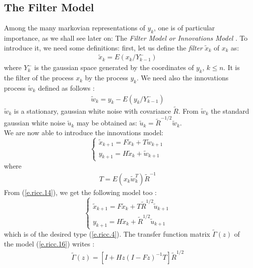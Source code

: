 \subsection{The Filter Model}
\label{filter}
Among the many markovian representations of $y_k$, one is of particular
importance, as we shall see later on: 
The {\em Filter Model {\em or} Innovations Model} . 
To introduce it, we need some definitions: first, let us define 
the {\em filter} $\tilde{x}_k$ of $x_k$ as:
\begin{eqnarray}
\tilde{x}_k=E(x_k/ Y^-_{k-1})
\label{e.ricc.12}
\end{eqnarray}
where $Y^-_{k}$ 
is the gaussian space  generated by the 
coordinates of $y_k$, $k\leq n$. 
It is the filter of the process $x_k$ by the process $y_k$.
We need also the innovations process 
$\tilde{w}_k$ defined as follows :
\begin{eqnarray}
\tilde{w}_k=y_k-E(y_k/Y^-_{k-1})
\label{e.ricc.13}
\end{eqnarray}
$\tilde{w}_k$ is a stationary, gaussian white noise with covariance
$\tilde{R}$. From $\tilde{w}_k$ the standard gaussian white noise 
$\tilde{u}_k$ may be obtained as: $\tilde{u}_k=\tilde{R}^{-1/2}\tilde{w}_k$.\\
We are now able to introduce the innovations model:
\begin{equation}
\left\{ \begin{array}{ll}
\tilde{x}_{k+1}=F\tilde{x}_k + T\tilde{w}_{k+1}\\
y_{k+1}=H\tilde{x}_k + \tilde{w}_{k+1}
\end{array} \right.
\label{e.ricc.14}
\end{equation}
where
\begin{eqnarray}
T=E(x_k\tilde{w}_k^T)\tilde{R}^{-1}
\label{e.ricc.15}
\end{eqnarray}
From (\ref{e.ricc.14}), we get the following model too : 
\begin{equation}
\left\{
\begin{array}{ll}
\tilde{x}_{k+1}=F\tilde{x}_k + T\tilde{R}^{1/2}\tilde{u}_{k+1}\\
y_{k+1}=H\tilde{x}_k + \tilde{R}^{1/2}\tilde{u}_{k+1} 
\end{array} \right.
\label{e.ricc.16}
\end{equation}
which is of the desired type (\ref{e.ricc.4}).
The transfer function matrix $\tilde{\Gamma }(z)$ of the model (\ref{e.ricc.16})
writes :
\begin{eqnarray}
\tilde{\Gamma }(z)=[I+Hz(I-Fz)^{-1}T]\tilde{R}^{1/2}
\label{e.ricc.17}
\end{eqnarray}
